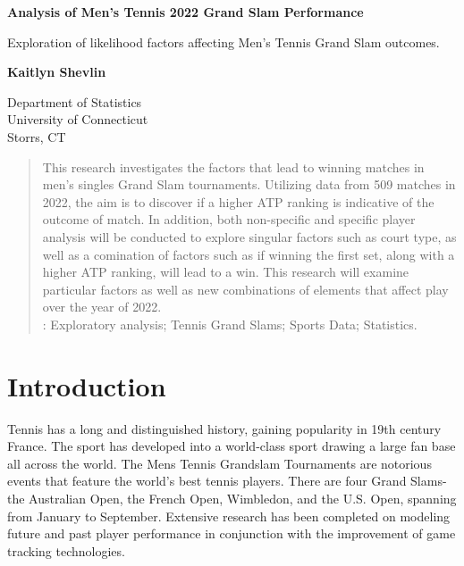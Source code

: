 \documentclass[12pt]{article}
\begin{document}
\begin{titlepage}
  \begin{center}
      \vspace*{1cm}
      \Huge
      \textbf{Analysis of Men's Tennis 2022 Grand Slam Performance}

      \large
      \vspace{0.5cm}
       Exploration of likelihood factors affecting Men's Tennis Grand Slam outcomes.
           
      \vspace{1.5cm}

      \textbf{Kaitlyn Shevlin}
     
      \vspace{0.8cm}
        
       \Large    
      Department of Statistics\\
      University of Connecticut\\
      Storrs, CT\\
           
  \end{center}
\end{titlepage}

\doublespace{}

\begin{abstract}

This research investigates the factors that lead to winning matches in men's 
singles Grand Slam tournaments. Utilizing data from 509 matches in 2022, 
the aim is to discover if a higher ATP ranking is indicative of the outcome of 
match. In addition, both non-specific and specific player analysis will be 
conducted to explore singular factors such as court type, as well as a comination 
of factors such as if winning the first set, along with a higher ATP ranking, will 
lead to a win. This research will examine particular factors as well as new combinations
of elements that affect play over the year of 2022.\\

:
Exploratory analysis; Tennis Grand Slams; Sports Data; Statistics.
\end{abstract}


\section{Introduction}
\label{sec:intro}

Tennis has a long and distinguished history, gaining popularity in
19th century France. The sport has developed into a world-class sport
drawing a large fan base all across the world. The Mens Tennis Grandslam 
Tournaments are notorious events that feature the world's best tennis players. 
There are four Grand Slams- the Australian Open, the French Open, Wimbledon, 
and the U.S. Open, spanning from January to September. Extensive research has 
been completed on modeling future and past player performance in conjunction 
with the improvement of game tracking technologies.
\end{document}
